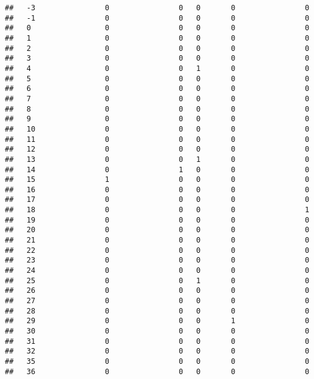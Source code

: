 \documentclass[]{article}
\begin{document}
\begin{verbatim}
##   -3                0                0   0       0                0
##   -1                0                0   0       0                0
##   0                 0                0   0       0                0
##   1                 0                0   0       0                0
##   2                 0                0   0       0                0
##   3                 0                0   0       0                0
##   4                 0                0   1       0                0
##   5                 0                0   0       0                0
##   6                 0                0   0       0                0
##   7                 0                0   0       0                0
##   8                 0                0   0       0                0
##   9                 0                0   0       0                0
##   10                0                0   0       0                0
##   11                0                0   0       0                0
##   12                0                0   0       0                0
##   13                0                0   1       0                0
##   14                0                1   0       0                0
##   15                1                0   0       0                0
##   16                0                0   0       0                0
##   17                0                0   0       0                0
##   18                0                0   0       0                1
##   19                0                0   0       0                0
##   20                0                0   0       0                0
##   21                0                0   0       0                0
##   22                0                0   0       0                0
##   23                0                0   0       0                0
##   24                0                0   0       0                0
##   25                0                0   1       0                0
##   26                0                0   0       0                0
##   27                0                0   0       0                0
##   28                0                0   0       0                0
##   29                0                0   0       1                0
##   30                0                0   0       0                0
##   31                0                0   0       0                0
##   32                0                0   0       0                0
##   35                0                0   0       0                0
##   36                0                0   0       0                0

\end{verbatim}
\end{document}
